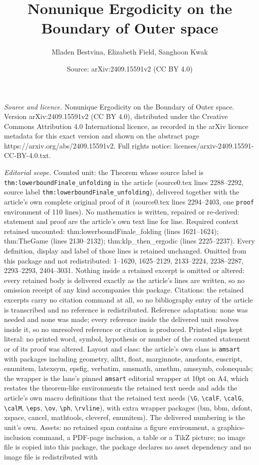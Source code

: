 \documentclass[10pt,a4paper]{amsart}
\title[Nonunique Ergodicity on the Boundary of Outer space]{Nonunique Ergodicity on the Boundary of Outer space}
\author{Mladen Bestvina, Elizabeth Field, Sanghoon Kwak}
\date{Source: arXiv:2409.15591v2 (CC BY 4.0)}
\begin{document}
\maketitle

\noindent\emph{Source and licence.} Nonunique Ergodicity on the Boundary of Outer space. Version arXiv:2409.15591v2 (CC BY 4.0), distributed under the Creative Commons Attribution 4.0 International licence, as recorded in the arXiv licence metadata for this exact version and shown on the abstract page https://arxiv.org/abs/2409.15591v2. Full rights notice: licenses/arxiv-2409.15591-CC-BY-4.0.txt.\par\smallskip

\noindent\textit{Editorial scope.} Counted unit: the Theorem whose source label is \texttt{thm:lowerboundFinale\_unfolding} in the article (source0.tex lines 2288--2292, source label \texttt{thm:lowerboundFinale\_unfolding}), delivered together with the article's own complete original proof of it (source0.tex lines 2294--2403, one \texttt{proof} environment of 110 lines). No mathematics is written, repaired or re-derived: statement and proof are the article's own text line for line. Required context retained uncounted: thm:lowerboundFinale\_folding (lines 1621--1624); thm:TheGame (lines 2130--2132); thm:klp\_then\_ergodic (lines 2225--2237). Every definition, display and label of those lines is retained unchanged. Omitted from this package and not redistributed: 1--1620, 1625--2129, 2133--2224, 2238--2287, 2293--2293, 2404--3031. Nothing inside a retained excerpt is omitted or altered: every retained body is delivered exactly as the article's lines are written, so no omission receipt of any kind accompanies this package. Citations: the retained excerpts carry no citation command at all, so no bibliography entry of the article is transcribed and no reference is redistributed. Reference adaptation: none was needed and none was made; every reference inside the delivered unit resolves inside it, so no unresolved reference or citation is produced. Printed slips kept literal: no printed word, symbol, hypothesis or number of the counted statement or of its proof was altered. Layout and class: the article's own class is \texttt{amsart} with packages including geometry, alltt, float, marginnote, amsfonts, euscript, enumitem, latexsym, epsfig, verbatim, amsmath, amsthm, amssymb, colonequals; the wrapper is the lane's pinned \texttt{amsart} editorial wrapper at 10pt on A4, which restates the theorem-like environments the retained text needs and adds the article's own macro definitions that the retained text needs (\texttt{\textbackslash G}, \texttt{\textbackslash calF}, \texttt{\textbackslash calG}, \texttt{\textbackslash calM}, \texttt{\textbackslash eps}, \texttt{\textbackslash ov}, \texttt{\textbackslash ph}, \texttt{\textbackslash rvline}), with extra wrapper packages (bm, bbm, dsfont, xspace, cancel, mathtools, cleveref, enumitem). The delivered numbering is the unit's own. Assets: no retained span contains a figure environment, a graphics-inclusion command, a PDF-page inclusion, a table or a TikZ picture; no image file is copied into this package, the package declares no asset dependency and no image file is redistributed with 
\end{document}
